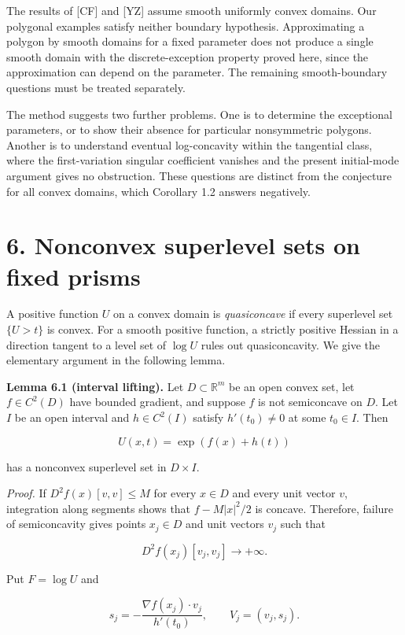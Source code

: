 \documentclass[11pt]{article}
\begin{document}
The results of {[}CF{]} and {[}YZ{]} assume smooth uniformly convex
domains. Our polygonal examples satisfy neither boundary hypothesis.
Approximating a polygon by smooth domains for a fixed parameter does not
produce a single smooth domain with the discrete-exception property
proved here, since the approximation can depend on the parameter. The
remaining smooth-boundary questions must be treated separately.

The method suggests two further problems. One is to determine the
exceptional parameters, or to show their absence for particular
nonsymmetric polygons. Another is to understand eventual log-concavity
within the tangential class, where the first-variation singular
coefficient vanishes and the present initial-mode argument gives no
obstruction. These questions are distinct from the conjecture for all
convex domains, which Corollary 1.2 answers negatively.

\section{6. Nonconvex superlevel sets on fixed
prisms}\label{nonconvex-superlevel-sets-on-fixed-prisms}

A positive function \(U\) on a convex domain is \emph{quasiconcave} if
every superlevel set \(\{U>t\}\) is convex. For a smooth positive
function, a strictly positive Hessian in a direction tangent to a level
set of \(\log U\) rules out quasiconcavity. We give the elementary
argument in the following lemma.

\textbf{Lemma 6.1 (interval lifting).} Let \(D\subset\mathbb R^m\) be an
open convex set, let \(f\in C^2(D)\) have bounded gradient, and suppose
\(f\) is not semiconcave on \(D\). Let \(I\) be an open interval and
\(h\in C^2(I)\) satisfy \(h'(t_0)\ne0\) at some \(t_0\in I\). Then

\[
U(x,t)=\exp(f(x)+h(t))
\tag{6.1}
\]

has a nonconvex superlevel set in \(D\times I\).

\emph{Proof.} If \(D^2 f(x)[v,v]\le M\) for every \(x\in D\) and every
unit vector \(v\), integration along segments shows that \(f-M|x|^2/2\)
is concave. Therefore, failure of semiconcavity gives points
\(x_j\in D\) and unit vectors \(v_j\) such that

\[
D^2f(x_j)[v_j,v_j]\longrightarrow+\infty.
\tag{6.2}
\]

Put \(F=\log U\) and

\[
s_j=-\frac{\nabla f(x_j)\cdot v_j}{h'(t_0)},
\qquad V_j=(v_j,s_j).
\tag{6.3}
\]
\end{document}
